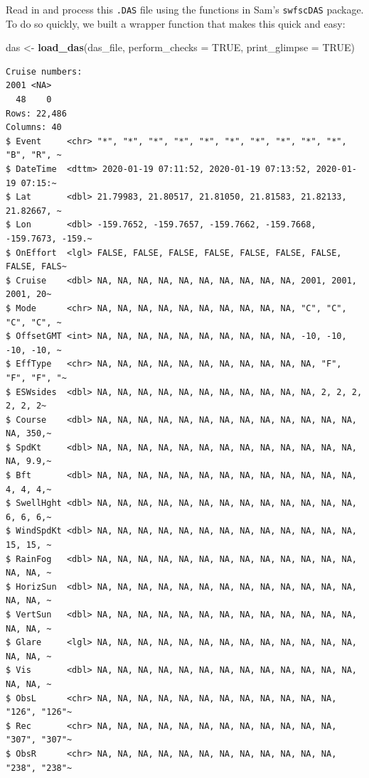 \documentclass[
]{book}
\newenvironment{Shaded}{\begin{snugshade}}{\end{snugshade}}
\newcommand{\DataTypeTok}[1]{\textcolor[rgb]{0.13,0.29,0.53}{#1}}
\newcommand{\KeywordTok}[1]{\textcolor[rgb]{0.13,0.29,0.53}{\textbf{#1}}}
\newcommand{\NormalTok}[1]{#1}
\newcommand{\OtherTok}[1]{\textcolor[rgb]{0.56,0.35,0.01}{#1}}
\newcommand{\StringTok}[1]{\textcolor[rgb]{0.31,0.60,0.02}{#1}}
\begin{document}
Read in and process this \texttt{.DAS} file using the functions in Sam's \texttt{swfscDAS} package. To do so quickly, we built a wrapper function that makes this quick and easy:

\begin{Shaded}
\begin{Highlighting}[]
\NormalTok{das <-}\StringTok{ }\KeywordTok{load_das}\NormalTok{(das_file, }
                \DataTypeTok{perform_checks =} \OtherTok{TRUE}\NormalTok{,}
                \DataTypeTok{print_glimpse =} \OtherTok{TRUE}\NormalTok{)}
\end{Highlighting}
\end{Shaded}

\begin{verbatim}
Cruise numbers: 
2001 <NA> 
  48    0 
Rows: 22,486
Columns: 40
$ Event     <chr> "*", "*", "*", "*", "*", "*", "*", "*", "*", "*", "B", "R", ~
$ DateTime  <dttm> 2020-01-19 07:11:52, 2020-01-19 07:13:52, 2020-01-19 07:15:~
$ Lat       <dbl> 21.79983, 21.80517, 21.81050, 21.81583, 21.82133, 21.82667, ~
$ Lon       <dbl> -159.7652, -159.7657, -159.7662, -159.7668, -159.7673, -159.~
$ OnEffort  <lgl> FALSE, FALSE, FALSE, FALSE, FALSE, FALSE, FALSE, FALSE, FALS~
$ Cruise    <dbl> NA, NA, NA, NA, NA, NA, NA, NA, NA, NA, 2001, 2001, 2001, 20~
$ Mode      <chr> NA, NA, NA, NA, NA, NA, NA, NA, NA, NA, "C", "C", "C", "C", ~
$ OffsetGMT <int> NA, NA, NA, NA, NA, NA, NA, NA, NA, NA, -10, -10, -10, -10, ~
$ EffType   <chr> NA, NA, NA, NA, NA, NA, NA, NA, NA, NA, NA, "F", "F", "F", "~
$ ESWsides  <dbl> NA, NA, NA, NA, NA, NA, NA, NA, NA, NA, NA, 2, 2, 2, 2, 2, 2~
$ Course    <dbl> NA, NA, NA, NA, NA, NA, NA, NA, NA, NA, NA, NA, NA, NA, 350,~
$ SpdKt     <dbl> NA, NA, NA, NA, NA, NA, NA, NA, NA, NA, NA, NA, NA, NA, 9.9,~
$ Bft       <dbl> NA, NA, NA, NA, NA, NA, NA, NA, NA, NA, NA, NA, NA, 4, 4, 4,~
$ SwellHght <dbl> NA, NA, NA, NA, NA, NA, NA, NA, NA, NA, NA, NA, NA, 6, 6, 6,~
$ WindSpdKt <dbl> NA, NA, NA, NA, NA, NA, NA, NA, NA, NA, NA, NA, NA, 15, 15, ~
$ RainFog   <dbl> NA, NA, NA, NA, NA, NA, NA, NA, NA, NA, NA, NA, NA, NA, NA, ~
$ HorizSun  <dbl> NA, NA, NA, NA, NA, NA, NA, NA, NA, NA, NA, NA, NA, NA, NA, ~
$ VertSun   <dbl> NA, NA, NA, NA, NA, NA, NA, NA, NA, NA, NA, NA, NA, NA, NA, ~
$ Glare     <lgl> NA, NA, NA, NA, NA, NA, NA, NA, NA, NA, NA, NA, NA, NA, NA, ~
$ Vis       <dbl> NA, NA, NA, NA, NA, NA, NA, NA, NA, NA, NA, NA, NA, NA, NA, ~
$ ObsL      <chr> NA, NA, NA, NA, NA, NA, NA, NA, NA, NA, NA, NA, "126", "126"~
$ Rec       <chr> NA, NA, NA, NA, NA, NA, NA, NA, NA, NA, NA, NA, "307", "307"~
$ ObsR      <chr> NA, NA, NA, NA, NA, NA, NA, NA, NA, NA, NA, NA, "238", "238"~

\end{verbatim}
\end{document}
